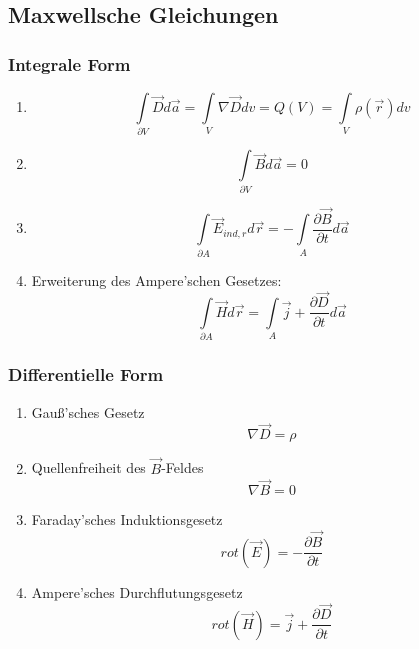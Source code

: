 \documentclass[a4paper,twocolumn,10pt]{article}
\begin{document}
\subsection{Maxwellsche Gleichungen}

\subsubsection{Integrale Form}
\begin{enumerate}[label=$\bullet$]
\item
\begin{equation*}
\int\limits_{\partial V}\overrightarrow{D}d\overrightarrow{a}=\int\limits_{V}\nabla\overrightarrow{D}dv=Q(V)=\int\limits_{V}\rho(\overrightarrow{r})dv
\end{equation*}
\item
\begin{equation*}
\int\limits_{\partial V}\overrightarrow{B}d\overrightarrow{a}=0
\end{equation*}
\item
\begin{equation*}
\int\limits_{\partial A}\overrightarrow{E}_{ind,r}d\overrightarrow{r}=-\int\limits_{A}\frac{\partial\overrightarrow{B}}{\partial t}d\overrightarrow{a}
\end{equation*}
\item Erweiterung des Ampere'schen Gesetzes:
\begin{equation*}
\int\limits_{\partial A}\overrightarrow{H}d\overrightarrow{r}=\int\limits_{A}\overrightarrow{j}+\frac{\partial \overrightarrow{D}}{\partial t}d\overrightarrow{a}
\end{equation*}
\end{enumerate}

\subsubsection{Differentielle Form}
\begin{enumerate}[label=$\bullet$]
\item Gauß'sches Gesetz
\begin{equation*}
\nabla\overrightarrow{D}=\rho
\end{equation*}
\item Quellenfreiheit des $\overrightarrow{B}$-Feldes
\begin{equation*}
\nabla\overrightarrow{B}=0
\end{equation*}
\item Faraday'sches Induktionsgesetz
\begin{equation*}
rot(\overrightarrow{E})=-\frac{\partial \overrightarrow{B}}{\partial t}
\end{equation*}
\item Ampere'sches Durchflutungsgesetz
\begin{equation*}
rot(\overrightarrow{H})=\overrightarrow{j}+\frac{\partial \overrightarrow{D}}{\partial t}
\end{equation*}
\end{enumerate}
\end{document}
